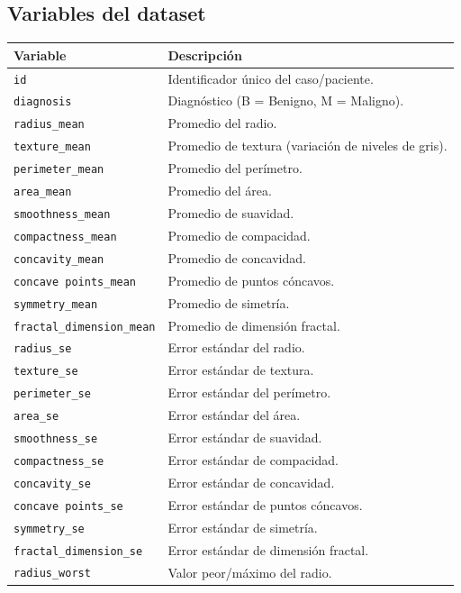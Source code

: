 \documentclass[12pt]{article}
\begin{document}
\subsection{Variables del dataset}
\begin{longtable}{p{} p{}}
\toprule
\textbf{Variable} & \textbf{Descripción} \\
\midrule
\endhead
\texttt{id} & Identificador único del caso/paciente. \\
\texttt{diagnosis} & Diagnóstico (B = Benigno, M = Maligno). \\
\texttt{radius\_mean} & Promedio del radio. \\
\texttt{texture\_mean} & Promedio de textura (variación de niveles de gris). \\
\texttt{perimeter\_mean} & Promedio del perímetro. \\
\texttt{area\_mean} & Promedio del área. \\
\texttt{smoothness\_mean} & Promedio de suavidad. \\
\texttt{compactness\_mean} & Promedio de compacidad. \\
\texttt{concavity\_mean} & Promedio de concavidad. \\
\texttt{concave points\_mean} & Promedio de puntos cóncavos. \\
\texttt{symmetry\_mean} & Promedio de simetría. \\
\texttt{fractal\_dimension\_mean} & Promedio de dimensión fractal. \\
\texttt{radius\_se} & Error estándar del radio. \\
\texttt{texture\_se} & Error estándar de textura. \\
\texttt{perimeter\_se} & Error estándar del perímetro. \\
\texttt{area\_se} & Error estándar del área. \\
\texttt{smoothness\_se} & Error estándar de suavidad. \\
\texttt{compactness\_se} & Error estándar de compacidad. \\
\texttt{concavity\_se} & Error estándar de concavidad. \\
\texttt{concave points\_se} & Error estándar de puntos cóncavos. \\
\texttt{symmetry\_se} & Error estándar de simetría. \\
\texttt{fractal\_dimension\_se} & Error estándar de dimensión fractal. \\
\texttt{radius\_worst} & Valor peor/máximo del radio. \\

\end{longtable}
\end{document}
